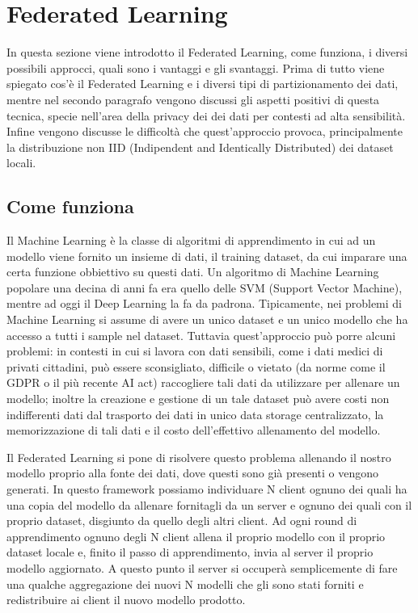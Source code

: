 \chapter{Federated Learning}
In questa sezione viene introdotto il Federated Learning, come funziona,
i diversi possibili approcci, quali sono i vantaggi e gli svantaggi.
Prima di tutto viene spiegato cos'è il Federated Learning e i diversi tipi
di partizionamento dei dati, mentre nel secondo paragrafo vengono discussi
gli aspetti positivi di questa tecnica, specie nell'area della privacy dei
dei dati per contesti ad alta sensibilità. Infine vengono discusse le
difficoltà che quest'approccio provoca, principalmente la distribuzione non
IID (Indipendent and Identically Distributed) dei dataset locali.

\section{Come funziona}
Il Machine Learning è la classe di algoritmi di apprendimento in cui ad un
modello viene fornito un insieme di dati, il training dataset, da cui
imparare una certa funzione obbiettivo su questi dati. Un algoritmo di 
Machine Learning popolare una decina di anni fa era quello delle SVM
(Support Vector Machine), mentre ad oggi il Deep Learning la fa da padrona.
Tipicamente, nei problemi di Machine Learning si assume di avere un unico
dataset e un unico modello che ha accesso a tutti i sample nel dataset.
Tuttavia quest'approccio può porre alcuni problemi: in contesti in cui si
lavora con dati sensibili, come i dati medici di privati cittadini, può 
essere sconsigliato, difficile o vietato (da norme come il GDPR o il più
recente AI act) raccogliere tali dati da utilizzare per allenare un modello;
inoltre la creazione e gestione di un tale dataset può avere costi non
indifferenti dati dal trasporto dei dati in unico data storage centralizzato,
la memorizzazione di tali dati e il costo dell'effettivo allenamento del
modello.

Il Federated Learning si pone di risolvere questo problema allenando il nostro
modello proprio alla fonte dei dati, dove questi sono già presenti o vengono
generati. In questo framework possiamo individuare N client ognuno dei quali
ha una copia del modello da allenare fornitagli da un server e ognuno dei quali
con il proprio dataset, disgiunto da quello degli altri client.
Ad ogni round di apprendimento ognuno degli N client allena il proprio modello 
con il proprio dataset locale e, finito il passo di apprendimento, invia al
server il proprio modello aggiornato. A questo punto il server si occuperà 
semplicemente di fare una qualche aggregazione dei nuovi N modelli che gli sono
stati forniti e redistribuire ai client il nuovo modello prodotto.

